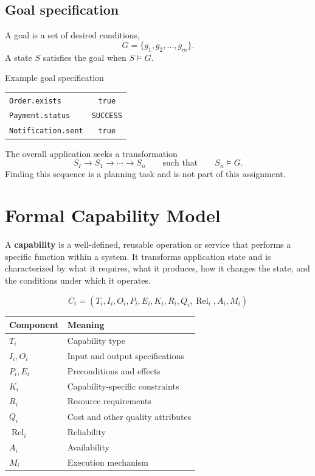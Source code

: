 \documentclass[11pt]{article}
\newcommand{\term}[1]{\textbf{\color{navy}#1}}
\newcommand{\code}[1]{\texttt{#1}}
\begin{document}
\subsection{Goal specification}

A goal is a set of desired conditions,
\[
  G=\{g_1,g_2,\ldots,g_m\}.
\]
A state \(S\) satisfies the goal when \(S\models G\).

\begin{examplebox}{Example goal specification}
\begin{tabularx}{\textwidth}{@{}Yc@{}}
\code{Order.exists} & \code{true} \\[0.45em]
\code{Payment.status} & \code{SUCCESS} \\[0.45em]
\code{Notification.sent} & \code{true}
\end{tabularx}
\end{examplebox}
The overall application seeks a transformation
\[
  S_I \longrightarrow S_1 \longrightarrow \cdots \longrightarrow S_n
  \qquad\text{such that}\qquad S_n\models G.
\]
Finding this sequence is a planning task and is not part of this assignment.

\section{Formal Capability Model}

A \term{capability} is a well-defined, reusable operation or service that performs a
specific function within a system. It transforms application state and is characterized by
what it requires, what it produces, how it changes the state, and the conditions under
which it operates.

\begin{keybox}[title={Formal capability representation}]
\[
  C_i=(T_i,I_i,O_i,P_i,E_i,K_i,R_i,Q_i,\operatorname{Rel}_i,A_i,M_i)
\]
\small
\begin{tabularx}{\textwidth}{@{}L{2.2cm}Y@{}}
\toprule
\textbf{Component} & \textbf{Meaning} \\
\midrule
\(T_i\) & Capability type \\[0.25em]
\(I_i, O_i\) & Input and output specifications \\[0.25em]
\(P_i, E_i\) & Preconditions and effects \\[0.25em]
\(K_i\) & Capability-specific constraints \\[0.25em]
\(R_i\) & Resource requirements \\[0.25em]
\(Q_i\) & Cost and other quality attributes \\[0.25em]
\(\operatorname{Rel}_i\) & Reliability \\[0.25em]
\(A_i\) & Availability \\[0.25em]
\(M_i\) & Execution mechanism \\
\bottomrule
\end{tabularx}
\end{keybox}
\end{document}
